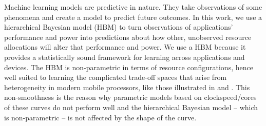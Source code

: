 
Machine learning models are predictive in nature.  They take
observations of some phenomena and create a model to predict future
outcomes. In this work, we use a hierarchical Bayesian model (HBM) to
turn observations of applications' performance and power into
predictions about how other, unobserved resource allocations will
alter that performance and power.  We use a HBM because it provides a
statistically sound framework for learning across applications and
devices.  The HBM is non-parametric in terms of resource
configurations, hence well suited to learning the complicated
trade-off spaces that arise from heterogeneity in modern mobile
processors, like those illustrated in  and .  This
non-smoothness is the reason why parametric models based on
clockspeed/cores of these curves do not perform well and the
hierarchical Bayesian model -- which is non-parametric -- is not
affected by the shape of the curve. 



